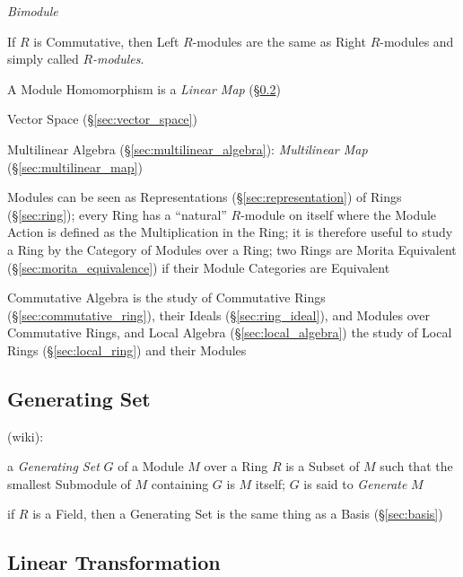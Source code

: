 \emph{Bimodule}

If $R$ is Commutative, then Left $R$-modules are the same as Right
$R$-modules and simply called \emph{$R$-modules}.

A Module Homomorphism is a \emph{Linear Map} (\S\ref{sec:linear_transformation})

Vector Space (\S\ref{sec:vector_space})

Multilinear Algebra (\S\ref{sec:multilinear_algebra}):
\emph{Multilinear Map} (\S\ref{sec:multilinear_map})

Modules can be seen as Representations (\S\ref{sec:representation}) of Rings
(\S\ref{sec:ring}); every Ring has a ``natural'' $R$-module on itself where the
Module Action is defined as the Multiplication in the Ring; it is therefore
useful to study a Ring by the Category of Modules over a Ring; two Rings are
Morita Equivalent (\S\ref{sec:morita_equivalence}) if their Module Categories
are Equivalent

\fist Commutative Algebra is the study of Commutative Rings
(\S\ref{sec:commutative_ring}), their Ideals (\S\ref{sec:ring_ideal}), and
Modules over Commutative Rings, and Local Algebra (\S\ref{sec:local_algebra})
the study of Local Rings (\S\ref{sec:local_ring}) and their Modules



\subsection{Generating Set}\label{sec:generating_set}

(wiki):

a \emph{Generating Set} $G$ of a Module $M$ over a Ring $R$ is a Subset of $M$
such that the smallest Submodule of $M$ containing $G$ is $M$ itself; $G$ is
said to \emph{Generate} $M$

if $R$ is a Field, then a Generating Set is the same thing as a Basis
(\S\ref{sec:basis})



\subsection{Linear Transformation}\label{sec:linear_transformation}

